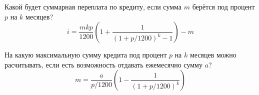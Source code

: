 
\begin{zztask}
Какой будет суммарная переплата по кредиту, если сумма $m$ берётся
под процент $p$ на $k$ месяцев?
%
\[
i = \frac{mkp}{1200}\left(1 + \frac{1}{(1 + p/1200)^k - 1}\right) - m
\]
\end{zztask}


\begin{zztask}
На какую максимальную сумму кредита под процент $p$ на $k$ месяцев
можно расчитывать, если есть возможность отдавать ежемесячно сумму $a$?
%
\[
m = \frac{a}{p/1200}\left(1 - \frac{1}{(1 + p/1200)^k}\right)
\]
\end{zztask}


